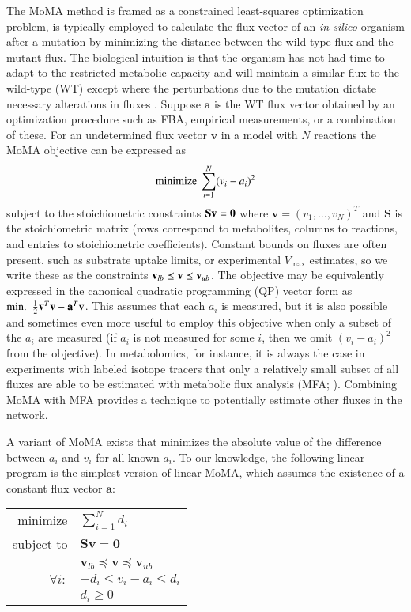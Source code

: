 The MoMA method is framed as a constrained least-squares optimization
problem, is typically employed to calculate the flux vector of an
\textit{in silico} organism after a mutation by minimizing the distance
between the wild-type flux and the mutant flux. The biological
intuition is that the organism has not had time to adapt to the
restricted metabolic capacity and will maintain a similar flux to the
wild-type (WT) except where the perturbations due to the mutation
dictate necessary alterations in fluxes \citep{Shlomi2005}. Suppose
$\mathbf{a}$ is the WT flux vector obtained by an optimization
procedure such as FBA, empirical measurements, or a combination of
these. For an undetermined flux vector $\mathbf{v}$ in a model with
$N$ reactions the MoMA objective can be expressed as
\[ \textnormal{minimize}\ \sum\limits_{i=1}^N (v_i-a_i)^2 \] 
subject to the stoichiometric constraints $\mathbf{S v}\nolinebreak
=\nolinebreak \mathbf{0}$ where $\mathbf{v} = (v_1, \ldots,
v_N)^T$ and $\mathbf{S}$ is the stoichiometric matrix (rows correspond
to metabolites, columns to reactions, and entries to stoichiometric
coefficients). Constant bounds on fluxes are often present, such as
substrate uptake limits, or experimental $V_{\max}$ estimates, so we
write these as the constraints $\mathbf{v}_{lb}\nolinebreak
\preceq\nolinebreak \mathbf{v}\nolinebreak \preceq \mathbf{v}_{ub}$.
The objective may be equivalently expressed in the canonical
quadratic programming (QP) vector form as
$\textnormal{min.\ }\ \frac{1}{2}\mathbf{v}^T \mathbf{v}\nolinebreak
-\nolinebreak \mathbf{a}^T \mathbf{v}$. This assumes that each $a_i$
is measured, but it is also possible and sometimes even more useful to
employ this objective when only a subset of the $a_i$ are measured (if
$a_i$ is not measured for some $i$, then we omit $(v_i-a_i)^2$ from
the objective). In metabolomics, for instance, it is always the case
in experiments with labeled isotope tracers that only a relatively
small subset of all fluxes are able to be estimated with metabolic
flux analysis (MFA; \citealt{Shestov2013a}). Combining MoMA with MFA
provides a technique to potentially estimate other fluxes in the
network.

A variant of MoMA exists that minimizes the absolute value of the
difference between $a_i$ and $v_i$ for all known $a_i$. To our
knowledge, the following linear program is the simplest version of
linear MoMA, which assumes the existence of a constant flux vector
$\mathbf{a}$:

\begin{center}
\begin{tabular}{rl}
minimize & $\sum\limits_{i=1}^N d_i$  \\
subject to & $\mathbf{S v} = \mathbf{0}$ \\
 & $\mathbf{v}_{lb} \preceq \mathbf{v} \preceq \mathbf{v}_{ub}$ \\
$\forall i:$ & $-d_i \le v_i-a_i \le d_i$ \\
 & $d_i \ge 0$
\end{tabular}
\end{center}

